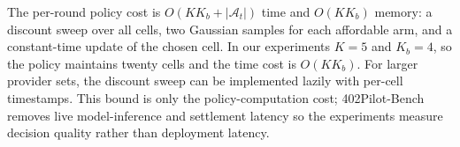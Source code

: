 The per-round policy cost is $O(KK_b+|\mathcal{A}_t|)$ time and $O(KK_b)$ memory: a discount sweep over all cells, two Gaussian samples for each affordable arm, and a constant-time update of the chosen cell. In our experiments $K=5$ and $K_b=4$, so the policy maintains twenty cells and the time cost is $O(KK_b)$. For larger provider sets, the discount sweep can be implemented lazily with per-cell timestamps. This bound is only the policy-computation cost; 402Pilot-Bench removes live model-inference and settlement latency so the experiments measure decision quality rather than deployment latency.
